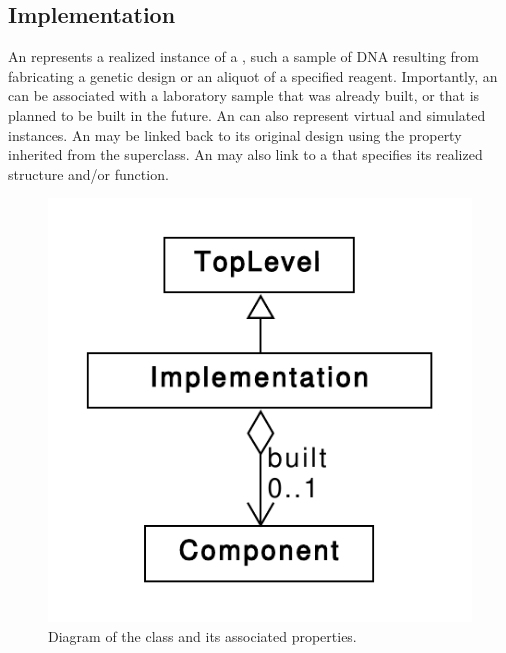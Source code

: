 \subsection{Implementation}
\label{sec:Implementation}


An  represents a realized instance of a , such a sample of DNA resulting from fabricating a genetic design or an aliquot of a specified reagent.
Importantly, an  can be associated with a laboratory sample that was already built, or that is planned to be built in the future. 
An  can also represent virtual and simulated instances.  
An  may be linked back to its original design using the  property inherited from the  superclass. An  may also link to a  that specifies its realized structure and/or function.

\begin{figure}[ht]
\begin{center}
\includegraphics[scale=0.65]{uml/implementation}
\caption[]{Diagram of the  class and its associated properties.}
\label{uml:implementation}
\end{center}
\end{figure}

